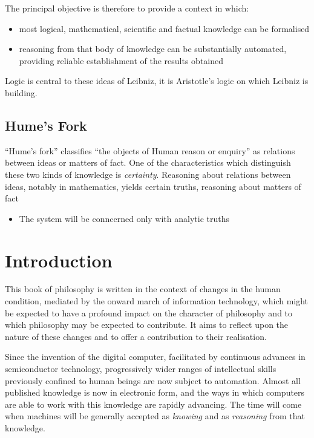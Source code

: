The principal objective is therefore to provide a context in which:

\begin{itemize}
\item most logical, mathematical, scientific and factual knowledge can be formalised
\item reasoning from that body of knowledge can be substantially automated, providing reliable establishment of the results obtained
\end{itemize}

Logic is central to these ideas of Leibniz, it is Aristotle's logic on which Leibniz is building.
 
\section{Hume's Fork}

``Hume's fork'' classifies ``the objects of Human reason or enquiry'' as relations between ideas or matters of fact.
One of the characteristics which distinguish these two kinds of knowledge is {\it certainty}.
Reasoning about relations between ideas, notably in mathematics, yields certain truths, reasoning about matters of fact 

\begin{itemize}
\item The system will be conncerned only with analytic truths
\end {itemize}

\chapter{Introduction}\label{IntroductionB}

This book of philosophy is written in the context of changes in the human
condition, mediated by the onward march of information technology, which
might be expected to have a profound impact on the character of philosophy
and to which philosophy may be expected to contribute.
It aims to reflect upon the nature of these changes and to offer a contribution
to their realisation.

Since the invention of the digital computer, facilitated by continuous advances
in semiconductor technology, progressively wider ranges of intellectual skills
previously confined to human beings are now subject to automation.
Almost all published knowledge is now in electronic form, and the ways in which
computers are able to work with this knowledge are rapidly advancing.
The time will come when machines will be generally accepted as {\it knowing}
and as {\it reasoning} from that knowledge.

